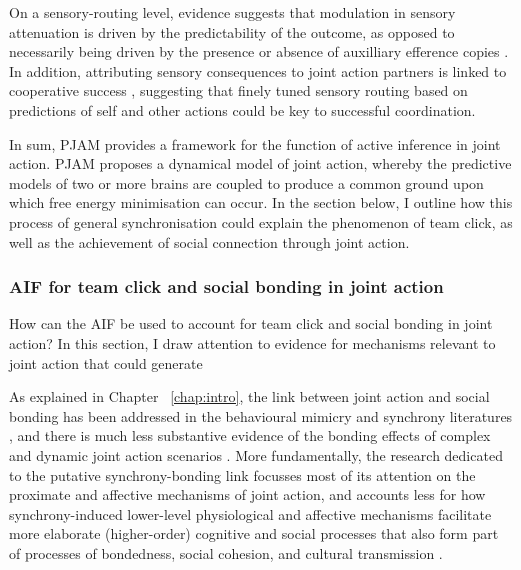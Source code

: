 \begin{CJK}{UTF8}{gbsn}
On a sensory-routing level, evidence suggests that modulation in sensory attenuation is driven by the predictability of the outcome, as opposed to necessarily being driven by the presence or absence of auxilliary efference copies \citep{Sato2008}.  In addition, attributing sensory consequences to joint action partners is linked to cooperative success \citep{Chaminade2012}, suggesting that finely tuned sensory routing based on predictions of self and other actions could be key to successful coordination.

In sum, PJAM provides a framework for the function of active inference in joint action.  PJAM proposes a dynamical model of joint action, whereby the predictive models of two or more brains are coupled to produce a common ground upon which free energy minimisation can occur.  In the section below, I outline how this process of general synchronisation could explain the phenomenon of team click, as well as the achievement of social connection through joint action.



\subsubsection{AIF for team click and social bonding in joint action\label{}}

How can the AIF be used to account for team click and social bonding in joint action? In this section, I draw attention to evidence for mechanisms relevant to joint action that could generate

As explained in Chapter ~\ref{chap:intro}, the link between joint action and social bonding has been addressed in the behavioural mimicry and synchrony literatures \citep[see Chapter ~\ref{chap:intro} Section ~\ref{sect:synchrony}. There is now strong evidence to suggest that a combination of 1) neuropharmacological reward arising from lower-cognitive affective mechanisms, 2) self-other merging resulting from neurocognitive alignment, and 3) reinforcement of cooperative relationships owing to experience of interpersonal association in joint action generates a psychophysiological environment conducive to generating social bonds.  Yet, almost all of these studies operationalise joint action as exact in-phase behavioural synchrony \citep[see][]{Mogan2017}, and there is much less substantive evidence of the bonding effects of complex and dynamic joint action scenarios \citep[but see][]{Marsh2009,Miles2009,Lumsden2012}.  More fundamentally, the research dedicated to the putative synchrony-bonding link focusses most of its attention on the proximate and affective mechanisms of joint action, and accounts less for how synchrony-induced lower-level physiological and affective mechanisms facilitate more elaborate (higher-order) cognitive and social processes that also form part of processes of bondedness, social cohesion, and cultural transmission \citep{Heyes2012}.


\end{CJK}
